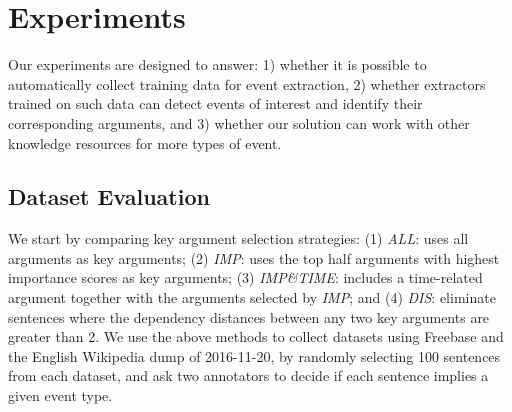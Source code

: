 \section{Experiments}
Our experiments are designed to answer: 1) whether it is possible to automatically collect training data for event extraction, 2) whether
extractors trained on such data can detect events of interest and identify their corresponding arguments, and 3) whether our solution can
work with other knowledge resources for more types of event.

 \subsection{Dataset Evaluation}\label{sec:evalhypo}
We start by comparing key argument selection strategies: %
(1) \emph{ALL}: uses all arguments as key arguments; (2) \emph{IMP}: uses the top half arguments with highest importance scores as key
arguments;
(3) \emph{IMP\&TIME}:  includes a time-related argument together with  the arguments selected by \emph{IMP};
and (4) \emph{DIS}: eliminate sentences where the dependency distances
 between any two key arguments are greater than 2.
We use the above methods to collect datasets using Freebase and the English Wikipedia dump of 2016-11-20, by randomly selecting 100
sentences from each dataset, and ask two annotators to decide if each sentence implies a given event type.




